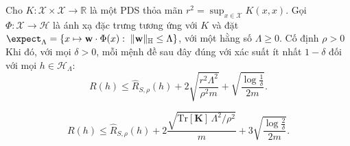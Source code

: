 \begin{cor}
\label{cor:margin-bound-kernel}

Cho $K : \mathcal{X} \times \mathcal{X} \to \mathbb{R}$
là một  PDS thỏa mãn
$r^2 = \sup_{x \in \mathcal{X}} K(x,x)$.
Gọi $\Phi : \mathcal{X} \to \mathcal{H}$
là ánh xạ đặc trưng tương ứng với $K$ và đặt
$
\expect_\Lambda
=
\left\{
x \mapsto \mathbf{w}\cdot \Phi(x)
:\;
\|\mathbf{w}\|_{\mathbb{H}} \le \Lambda
\right\}
$,
với một hằng số $\Lambda \ge 0$. Cố định $\rho > 0$
Khi đó, với mọi $\delta > 0$, mỗi mệnh đề sau đây đúng với xác suất ít nhất
$1-\delta$ đối với mọi $h \in \mathcal{H}_\Lambda$:
\begin{equation}
R(h)
\le
\widehat{R}_{S,\rho}(h)
+
2\sqrt{
\frac{r^2\Lambda^2}{\rho^2 m}
}
+
\sqrt{
\frac{\log \frac{1}{\delta}}{2m}
}.
\end{equation}

\begin{equation}
R(h)
\le
\widehat{R}_{S,\rho}(h)
+
2\frac{
\sqrt{\mathrm{Tr}[\mathbf{K}]\,\Lambda^2/\rho^2}
}{m}
+
3\sqrt{
\frac{\log \frac{2}{\delta}}{2m}
}.
\end{equation}

\end{cor}